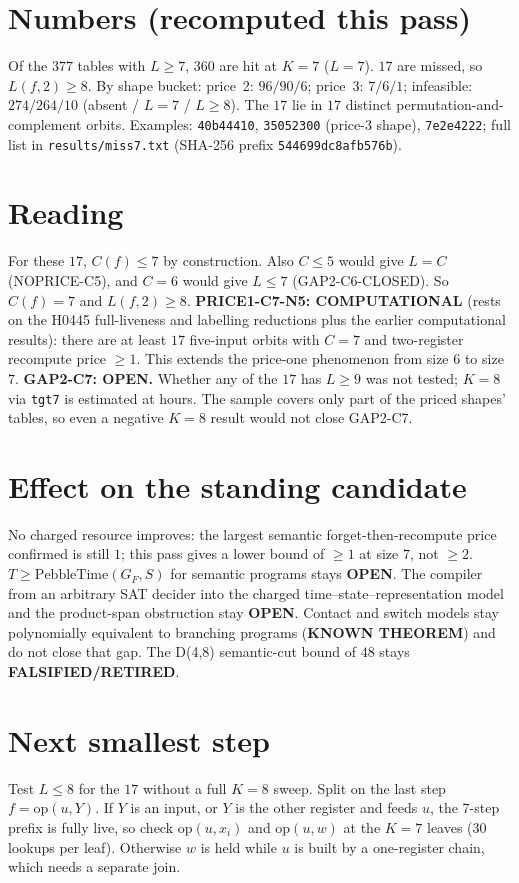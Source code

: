 \documentclass[11pt]{article}
\begin{document}
\section*{Numbers (recomputed this pass)}
Of the $377$ tables with $L\ge7$, $360$ are hit at $K=7$ ($L=7$). $17$ are missed, so $L(f,2)\ge8$. By shape bucket: price~2: $96/90/6$; price~3: $7/6/1$; infeasible: $274/264/10$ (absent / $L=7$ / $L\ge8$). The $17$ lie in $17$ distinct permutation-and-complement orbits. Examples: \texttt{40b44410}, \texttt{35052300} (price-3 shape), \texttt{7e2e4222}; full list in \texttt{results/miss7.txt} (SHA-256 prefix \texttt{544699dc8afb576b}).

\section*{Reading}
For these $17$, $C(f)\le7$ by construction. Also $C\le5$ would give $L=C$ (NOPRICE-C5), and $C=6$ would give $L\le7$ (GAP2-C6-CLOSED). So $C(f)=7$ and $L(f,2)\ge8$.
\textbf{PRICE1-C7-N5: COMPUTATIONAL} (rests on the H0445 full-liveness and labelling reductions plus the earlier computational results): there are at least $17$ five-input orbits with $C=7$ and two-register recompute price $\ge1$. This extends the price-one phenomenon from size $6$ to size $7$.
\textbf{GAP2-C7: OPEN.} Whether any of the $17$ has $L\ge9$ was not tested; $K=8$ via \texttt{tgt7} is estimated at hours. The sample covers only part of the priced shapes' tables, so even a negative $K=8$ result would not close GAP2-C7.

\section*{Effect on the standing candidate}
No charged resource improves: the largest semantic forget-then-recompute price confirmed is still $1$; this pass gives a lower bound of $\ge1$ at size $7$, not $\ge2$. $T\ge\mathrm{PebbleTime}(G_F,S)$ for semantic programs stays \textbf{OPEN}. The compiler from an arbitrary SAT decider into the charged time--state--representation model and the product-span obstruction stay \textbf{OPEN}. Contact and switch models stay polynomially equivalent to branching programs (\textbf{KNOWN THEOREM}) and do not close that gap. The D(4,8) semantic-cut bound of $48$ stays \textbf{FALSIFIED/RETIRED}.

\section*{Next smallest step}
Test $L\le8$ for the $17$ without a full $K=8$ sweep. Split on the last step $f=\mathrm{op}(u,Y)$. If $Y$ is an input, or $Y$ is the other register and feeds $u$, the 7-step prefix is fully live, so check $\mathrm{op}(u,x_i)$ and $\mathrm{op}(u,w)$ at the $K=7$ leaves ($30$ lookups per leaf). Otherwise $w$ is held while $u$ is built by a one-register chain, which needs a separate join.
\end{document}
